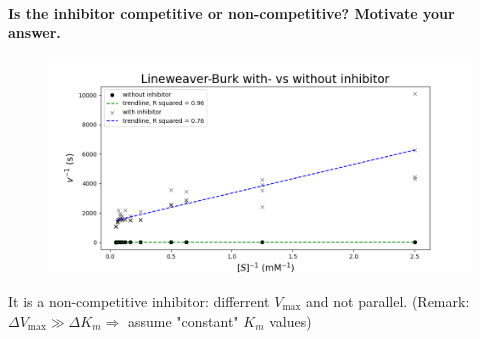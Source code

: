 \documentclass[a4paper,12pt]{article}
\begin{document}
\paragraph{Is the inhibitor competitive or non-competitive? Motivate your answer.}

\begin{figure}[htb]
    \includegraphics[scale=0.4]{fig3_6.png}
    \centering
\end{figure}

It is a non-competitive inhibitor: differrent $V_{\text{max}}$ and not parallel. (Remark: $\Delta V_{\text{max}} \gg \Delta K_m \Rightarrow$ assume "constant" $K_m$ values)
\end{document}
